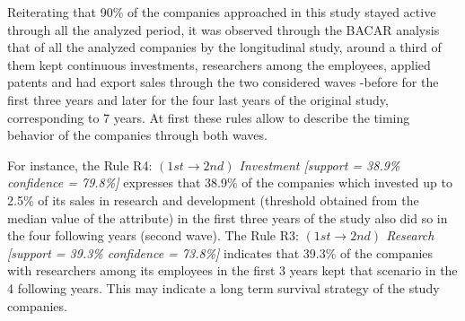 \documentclass[a4paper,twoside]{article}
\begin{document}
Reiterating that 90\% of the companies approached in this study stayed active through all the analyzed period, it was observed through the BACAR analysis that of all the analyzed companies by the longitudinal study, around a third of them kept continuous investments, researchers among the employees, applied patents and had export sales through the two considered waves -before for the first three years and later for the four last years of the original study, corresponding to 7 years. At first these rules allow to describe the timing behavior of the companies through both waves.

For instance, the Rule R4: \textit{$( 1st \to 2nd )$ Investment [support = 38.9\% confidence = 79.8\%]} expresses that 38.9\%  of the companies which invested up to 2.5\% of its sales in research and development (threshold obtained from the median value of the attribute) in the first three years of the study also did so in the four following years (second wave). The Rule R3: \textit{$( 1st \to 2nd )$ Research [support = 39.3\% confidence = 73.8\%]} indicates that 39.3\% of the companies with researchers among its employees in the first 3 years kept that scenario in the 4 following years. This may indicate a long term survival strategy of the study companies.
\end{document}
